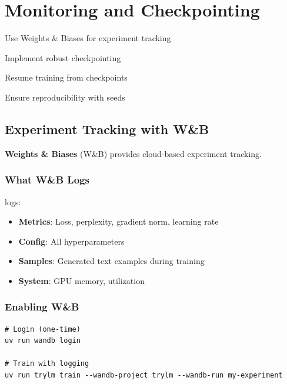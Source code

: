 \chapter{Monitoring and Checkpointing}
\label{ch:monitoring-checkpointing}

\begin{objectives}
    \item Use Weights \& Biases for experiment tracking
    \item Implement robust checkpointing
    \item Resume training from checkpoints
    \item Ensure reproducibility with seeds
\end{objectives}

\section{Experiment Tracking with W\&B}

\textbf{Weights \& Biases} (W\&B) provides cloud-based experiment tracking.

\subsection{What W\&B Logs}

\TryLM logs:
\begin{itemize}
    \item \textbf{Metrics}: Loss, perplexity, gradient norm, learning rate
    \item \textbf{Config}: All hyperparameters
    \item \textbf{Samples}: Generated text examples during training
    \item \textbf{System}: GPU memory, utilization
\end{itemize}

\subsection{Enabling W\&B}

\begin{lstlisting}[style=shell]
# Login (one-time)
uv run wandb login

# Train with logging
uv run trylm train --wandb-project trylm --wandb-run my-experiment
\end{lstlisting}

